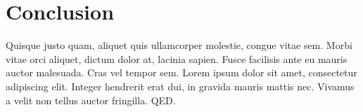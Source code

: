 \section{Conclusion}%
Quisque justo quam, aliquet quis ullamcorper molestie, congue vitae sem. Morbi vitae orci aliquet, dictum dolor at, lacinia sapien. Fusce facilisis ante eu mauris auctor malesuada. Cras vel tempor sem. Lorem ipsum dolor sit amet, consectetur adipiscing elit. Integer hendrerit erat dui, in gravida mauris mattis nec. Vivamus a velit non tellus auctor fringilla. QED.